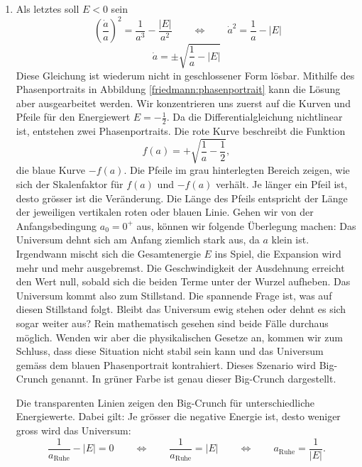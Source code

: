 \begin{refsection}
\begin{enumerate}
	\item Als letztes soll $E < 0$ sein
	\[\ \left(\frac{\dot{a}}{a} \right)^2 = \frac{1}{a^3} - \frac{|E|}{a^2} \qquad \Leftrightarrow \qquad \dot{a}^2 = \frac{1}{a} - |E|\]
	\begin{equation}
	\dot{a} = \pm \sqrt{\frac{1}{a} - |E|}
	\end{equation}
	Diese Gleichung ist wiederum nicht in geschlossener Form lösbar. Mithilfe des Phasenportraits in Abbildung \ref{friedmann:phasenportrait} kann die Lösung aber ausgearbeitet werden. Wir konzentrieren uns zuerst auf die Kurven und Pfeile für den Energiewert $E = -\frac{1}{2}$. Da die Differentialgleichung nichtlinear ist, entstehen zwei Phasenportraits.  Die rote Kurve beschreibt die Funktion \[f(a) = + \sqrt{\frac{1}{a} - \frac{1}{2}},\] die blaue Kurve $-f(a)$. Die Pfeile im grau hinterlegten Bereich zeigen, wie sich der Skalenfaktor für $f(a)$ und $-f(a)$ verhält. Je länger ein Pfeil ist, desto grösser ist die Veränderung. Die Länge des Pfeils entspricht der Länge der jeweiligen vertikalen roten oder blauen Linie. Gehen wir von der Anfangsbedingung $a_0 = 0^+$ aus, können wir folgende Überlegung machen:
	Das Universum dehnt sich am Anfang ziemlich stark aus, da $a$ klein ist. Irgendwann mischt sich die Gesamtenergie $E$ ins Spiel, die Expansion wird mehr und mehr ausgebremst. Die Geschwindigkeit der Ausdehnung erreicht den Wert null, sobald sich die beiden Terme unter der Wurzel aufheben. Das Universum kommt also zum Stillstand. 
	Die spannende Frage ist, was auf diesen Stillstand folgt. Bleibt das Universum ewig stehen oder dehnt es sich sogar weiter aus? Rein mathematisch gesehen sind beide Fälle durchaus möglich. Wenden wir aber die physikalischen Gesetze an, kommen wir zum Schluss, dass diese Situation nicht stabil sein kann und das Universum gemäss dem blauen Phasenportrait kontrahiert. Dieses Szenario wird Big-Crunch genannt. In grüner Farbe ist genau dieser Big-Crunch dargestellt. 
		
	Die transparenten Linien zeigen den Big-Crunch für unterschiedliche Energiewerte. Dabei gilt: Je grösser die negative Energie ist, desto weniger gross wird das Universum:
	\[\frac{1}{a_\text{Ruhe}} - |E| = 0 \qquad\Leftrightarrow \qquad \frac{1}{a_\text{Ruhe}} = |E| \qquad\Leftrightarrow\qquad a_\text{Ruhe} = \frac{1}{|E|}.\]
\end{enumerate}


\end{refsection}
